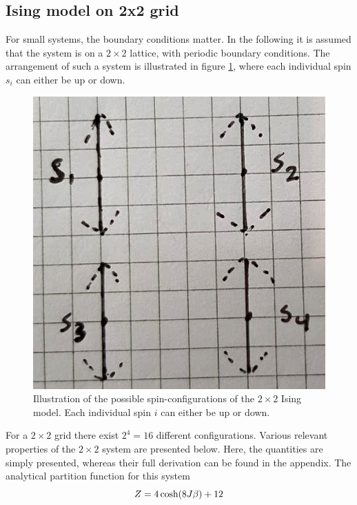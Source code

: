 \documentclass[%
reprint,nofootinbib,
amsmath,amssymb,
aps,
]{revtex4-1}
\begin{document}
\subsection{Ising model on 2x2 grid} \noindent 
For small systems, the boundary conditions matter. In the following it is assumed that the system is on a $2\times2$ lattice, with periodic boundary conditions. The arrangement of such a system is illustrated in figure \ref{si}, where each individual spin $s_i$ can either be up or down. \\ 
\begin{figure}
	\includegraphics[width = \columnwidth]{si.jpg}
	\caption{Illustration of the possible spin-configurations of the $2\times 2$ Ising model. Each individual spin $i$ can either be up or down.\label{si}}
\end{figure}
For a $2\times 2$ grid there exist $2^4 = 16$ different configurations. Various relevant properties of the $2\times 2$ system are presented below. Here, the quantities are simply presented, whereas their full derivation can be found in the appendix. The analytical partition function for this system 
\begin{equation} \vspace{1mm}
	Z =  4\cosh(8J\beta) + 12 
\end{equation} \vspace{1mm}
\end{document}
